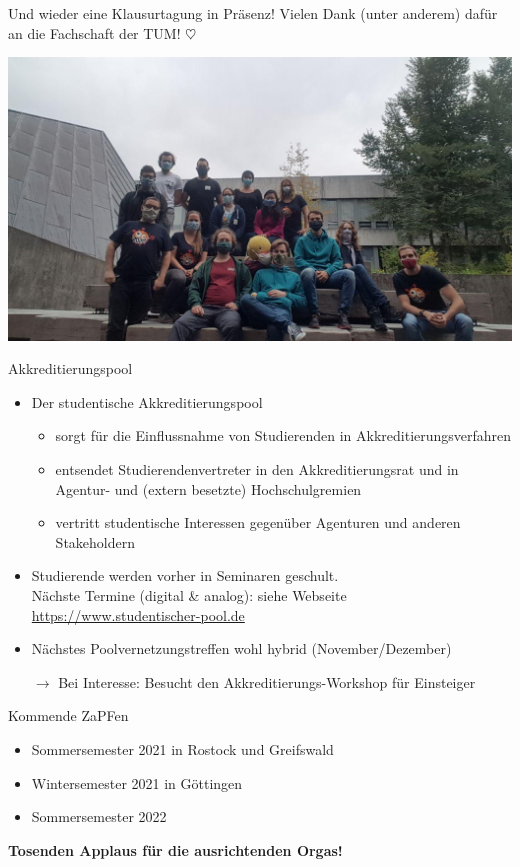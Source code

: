 \documentclass[compress, aspectratio=169]{beamer}
\begin{document}
\begin{frame}
\centering
Und wieder eine Klausurtagung in Präsenz! Vielen Dank (unter anderem) dafür an die Fachschaft der TUM! $\heartsuit$
\vspace{.5cm}

\includegraphics[width=.6\textwidth]{klausurtagung.jpg}
\end{frame}


\begin{frame}{Akkreditierungspool}
    \begin{itemize}
        \item Der studentische Akkreditierungspool
        \begin{itemize}
        	\item sorgt für die Einflussnahme von Studierenden in Akkreditierungsverfahren
        	\item entsendet Studierendenvertreter in den Akkreditierungsrat und in Agentur- und (extern besetzte) Hochschulgremien
        	\item vertritt studentische Interessen gegenüber Agenturen und anderen Stakeholdern
        \end{itemize}         
        \item Studierende werden vorher in Seminaren geschult. \\
          {\scriptsize\color{blue} Nächste Termine (digital \& analog): siehe Webseite \url{https://www.studentischer-pool.de}}
        \item Nächstes Poolvernetzungstreffen wohl hybrid {\color{blue} (November/Dezember)}
        \vspace{0.5cm}
        \item[$\rightarrow$] Bei Interesse: Besucht den Akkreditierungs-Workshop für Einsteiger
    \end{itemize}
\end{frame}

\begin{frame}{Kommende ZaPFen}
  \begin{itemize}
    \item Sommersemester 2021 in Rostock und Greifswald
    \item Wintersemester 2021 in Göttingen
    \item Sommersemester 2022 \textit{\color{blue}{bei euch?}}    
\end{itemize}
    \vspace{1cm}
    \begin{center}
      \huge \textbf{Tosenden Applaus für die ausrichtenden Orgas!}
    \end{center}
\end{frame}
\end{document}
